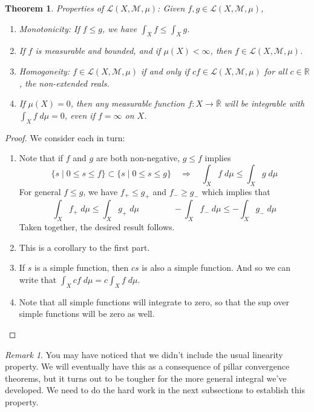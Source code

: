 \documentclass[12pt]{article}
\theoremstyle{plain}
\newtheorem{thm}{Theorem}[subsection]
\theoremstyle{definition}
\theoremstyle{remark}
\newtheorem*{rmk}{Remark}
\begin{document}
\begin{thm} \emph{Properties of $\mathscr{L}(X,\mathscr{M}, \mu)$:} Given $f,g\in\mathscr{L}(X,\mathscr{M},\mu)$,
    
    \begin{enumerate}
        \item {Monotonicity}: If $f\leq g$, we have $\int_X f \leq\int_X g$.
        \item If $f$ is measurable and bounded, and if $\mu(X)<\infty$, then $f\in\mathscr{L}(X,\mathscr{M},\mu)$.
        \item {Homogoneity}: $f\in\mathscr{L}(X,\mathscr{M},\mu)$ if and only if $cf\in\mathscr{L}(X,\mathscr{M},\mu)$ for all $c\in\mathbb{R}$, the non-extended reals.
        \item If $\mu(X)=0$, then \emph{any} measurable function $f: X\rightarrow\bar{\mathbb{R}}$ will be integrable with $\int_X f \; d\mu=0$, even if $f=\infty$ on $X$.
    \end{enumerate}
\end{thm}
\begin{proof} We consider each in turn:
\begin{enumerate} 

    \item Note that if $f$ and $g$ are both non-negative, $g\leq f$ implies
\[
    \{ s \; | \; 0\leq s\leq f \} \subset
    \{ s \; | \; 0\leq s\leq g \}  \quad\Rightarrow\quad
    \int_X f \; d\mu \leq
    \int_X g \; d\mu 
\]
For general $f\leq g$, we have $f_+ \leq g_+$ and $f_- \geq g_-$ which implies that 
\[
    \int_X f_+ \; d\mu \leq 
    \int_X g_+ \; d\mu
    \qquad\qquad 
    -\int_X f_- \; d\mu \leq 
    -\int_X g_- \; d\mu
\]
Taken together, the desired result follows.

    \item This is a corollary to the first part.  
        
    \item If $s$ is a simple function, then $cs$ is also a simple function. And so we can write that $\int_X cf \; d\mu = c\int_X f \; d\mu$.
        
    \item Note that all simple functions will integrate to zero, so that the sup over simple functions will be zero as well.
\end{enumerate}
\end{proof}

\begin{rmk}
You may have noticed that we didn't include the usual linearity property. We will eventually have this as a consequence of pillar convergence theorems, but it turns out to be tougher for the more general integral we've developed. We need to do the hard work in the next subsections to establish this property.
\end{rmk}
\end{document}
